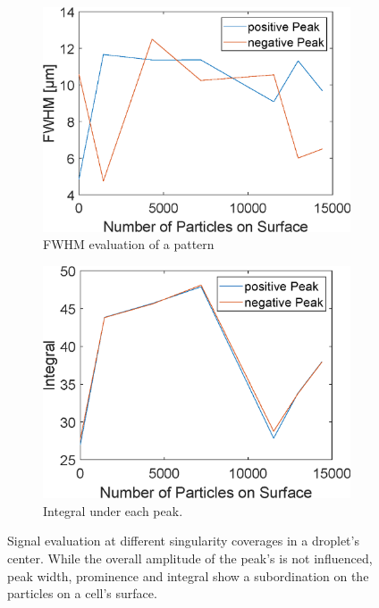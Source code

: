 \begin{figure}[htb!]
\begin{subfigure}[r]{0.49\linewidth}
		\centering
		\includegraphics[clip,trim={0mm 0mm 0mm 0mm}, width=\linewidth]{Ressourcen/Results/Singularity/fwhm}
		\caption{FWHM evaluation of a pattern}
		\label{fig:sim:singularity:fwhm}
	\end{subfigure}
	\hfil
	\begin{subfigure}[r]{0.49\linewidth} 
		\centering
		\includegraphics[clip,trim={0mm 0mm 0mm 0mm}, width=\linewidth]{Ressourcen/Results/Singularity/int}
		\caption{Integral under each peak.}
		\label{fig:sim:singularity:int}
	\end{subfigure}
	\caption{Signal evaluation at different singularity coverages in a droplet's center. While the overall amplitude of the peak's is not influenced, peak width, prominence and integral show a subordination on the particles on a cell's surface.}
	\label{fig:sim:singularity:peak_eval}
\end{figure}
\newpage
